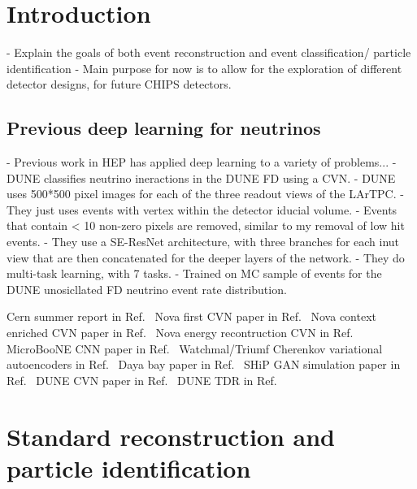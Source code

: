 \section{Introduction} %
\label{sec:cvn_intro} %

- Explain the goals of both event reconstruction and event classification/ particle identification
- Main purpose for now is to allow for the exploration of different detector designs, for future
CHIPS detectors.

\subsection{Previous deep learning for neutrinos} %
\label{sec:cvn_intro_previous} %

- Previous work in HEP has applied deep learning to a variety of problems...
- DUNE classifies neutrino ineractions in the DUNE FD using a CVN.
- DUNE uses 500*500 pixel images for each of the three readout views of the LArTPC.
- They just uses events with vertex within the detector iducial volume.
- Events that contain < 10 non-zero pixels are removed, similar to my removal of low hit events.
- They use a SE-ResNet architecture, with three branches for each inut view that are then
concatenated for the deeper layers of the network.
- They do multi-task learning, with 7 tasks.
- Trained on MC sample of events for the DUNE unosicllated FD neutrino event rate distribution.

Cern summer report in Ref.~\cite{theodore2016}
Nova first CVN paper in Ref.~\cite{aurisano2016}
Nova context enriched CVN paper in Ref.~\cite{psihas2019}
Nova energy recontruction CVN in Ref.~\cite{baldi2019}
MicroBooNE CNN paper in Ref.~\cite{acciarri2017}
Watchmal/Triumf Cherenkov variational autoencoders in Ref.~\cite{abhishek2019}
Daya bay paper in Ref.~\cite{racah2016}
SHiP GAN simulation paper in Ref.~\cite{ahdida2019}
DUNE CVN paper in Ref.~\cite{collaboration2020}
DUNE TDR in Ref.~\cite{abi2020}

\section{Standard reconstruction and particle identification} %
\label{sec:cvn_old} %

